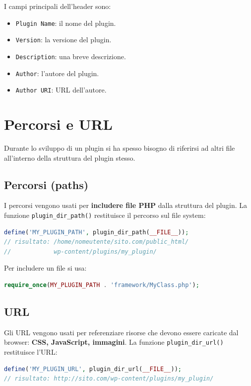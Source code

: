 I campi principali dell'header sono:

\begin{itemize}
    \item \texttt{Plugin Name}: il nome del plugin.
    \item \texttt{Version}: la versione del plugin.
    \item \texttt{Description}: una breve descrizione.
    \item \texttt{Author}: l'autore del plugin.
    \item \texttt{Author URI}: URL dell'autore.
\end{itemize}

\section{Percorsi e URL}

Durante lo sviluppo di un plugin si ha spesso bisogno di riferirsi ad altri file all'interno della struttura del plugin stesso.

\subsection{Percorsi (paths)}

I percorsi vengono usati per \textbf{includere file PHP} dalla struttura del plugin. La funzione \texttt{plugin\_dir\_path()} restituisce il percorso sul file system:

\begin{lstlisting}[language=PHP]
define('MY_PLUGIN_PATH', plugin_dir_path(__FILE__));
// risultato: /home/nomeutente/sito.com/public_html/
//            wp-content/plugins/my_plugin/
\end{lstlisting}

Per includere un file si usa:

\begin{lstlisting}[language=PHP]
require_once(MY_PLUGIN_PATH . 'framework/MyClass.php');
\end{lstlisting}

\subsection{URL}

Gli URL vengono usati per referenziare risorse che devono essere caricate dal browser: \textbf{CSS, JavaScript, immagini}. La funzione \texttt{plugin\_dir\_url()} restituisce l'URL:

\begin{lstlisting}[language=PHP]
define('MY_PLUGIN_URL', plugin_dir_url(__FILE__));
// risultato: http://sito.com/wp-content/plugins/my_plugin/
\end{lstlisting}


